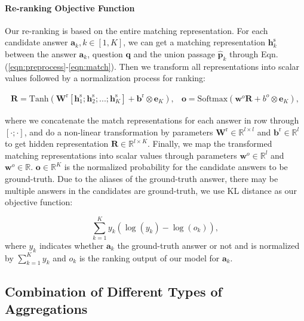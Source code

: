 \documentclass{article} \usepackage{iclr2018_conference,times}
\begin{document}
\paragraph{Re-ranking Objective Function} Our re-ranking is based on the entire matching representation. For each candidate answer $\mathbf{a}_k, k \in [1,K]$, we can get a matching representation $\mathbf{h}^{\text{s}}_k$ between the answer $\mathbf{a}_k$, question $\mathbf{q}$ and the union passage $\mathbf{\hat{p}}_k$ through Eqn. (\ref{eqn:preprocess}-\ref{eqn:match}). Then we transform all representations into scalar values followed by a normalization process for ranking:


\begin{equation}
\begin{matrix}
\mathbf{R} = \text{Tanh}\left( \mathbf{W}^\text{r}[\mathbf{h}^{\text{s}}_1;\mathbf{h}^{\text{s}}_2;...;\mathbf{h}^{\text{s}}_K] + \mathbf{b}^\text{r} \otimes \mathbf{e}_{K} \right ), &
\mathbf{o} = \text{Softmax}(\mathbf{w}^o \mathbf{R} + b^o \otimes \mathbf{e}_{K} ),
\label{eqn:gamma}
\end{matrix}
\end{equation}

where we concatenate the match representations for each answer in row through $[\cdot;\cdot]$, and do a non-linear transformation by parameters $\mathbf{W}^\text{r}\in \mathbb{R}^{l\times l}$ and $\mathbf{b}^\text{r} \in \mathbb{R}^l$ to get hidden representation $\mathbf{R}\in \mathbb{R}^{l\times K}$. Finally, we map the transformed matching representations  into scalar values through parameters $\mathbf{w}^o\in \mathbb{R}^l$ and $\mathbf{w}^o\in \mathbb{R}$. $\mathbf{o}\in \mathbb{R}^K$ is the normalized probability for the candidate answers to be ground-truth. Due to the aliases of the ground-truth answer, there may be multiple answers in the candidates are ground-truth, we use KL distance as our objective function:

\begin{equation}
\sum_{k=1}^{K} y_k \left( \log(y_k) - \log(o_k) \right),
\label{eqn:rank_obj_ideal}
\end{equation}
where $y_k$ indicates whether $\mathbf{a}_k$ the ground-truth answer or not and is normalized by $\sum_{k=1}^K y_k$ and $o_k$ is the ranking output of our model for $\mathbf{a}_k$.

\subsection{Combination of Different Types of Aggregations}
\label{sec:method_comb}
\end{document}
